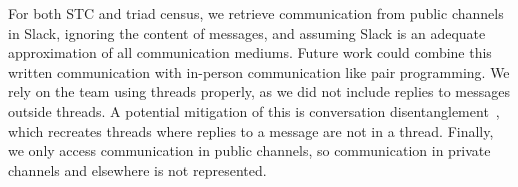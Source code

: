 For both STC and triad census, we retrieve communication from public channels in Slack, ignoring the content of messages, and assuming Slack is an adequate approximation of all communication mediums. Future work could combine this written communication with in-person communication like pair programming. We rely on the team using threads properly, as we did not include replies to messages outside threads. %
A potential mitigation of this is conversation disentanglement~\cite{elsnerYouTalkingMe2008}, which recreates threads where replies to a message are not in a thread. Finally, we only access communication in public channels, so communication in private channels and elsewhere is not represented.


